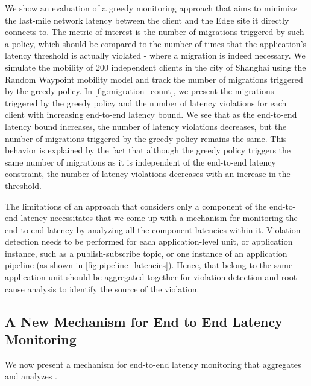 \par We show an evaluation of a greedy monitoring approach that aims to minimize the last-mile network latency between the client and the Edge site it directly connects to. The metric of interest is the number of migrations triggered by such a policy, which should be compared to the number of times that the application's latency threshold is actually violated - where a migration is indeed necessary. We simulate the mobility of 200 independent clients in the city of Shanghai using the Random Waypoint mobility model and track the number of migrations triggered by the greedy policy. In \cref{fig:migration_count}, we present the migrations triggered by the greedy policy and the number of latency violations for each client with increasing end-to-end latency bound. We see that as the end-to-end latency bound increases, the number of latency violations decreases, but the number of migrations triggered by the greedy policy remains the same. This behavior is explained by the fact that although the greedy policy triggers the same number of migrations as it is independent of the end-to-end latency constraint, the number of latency violations decreases with an increase in the threshold. 
\par The limitations of an approach that considers only a component of the end-to-end latency necessitates that we come up with a mechanism for monitoring the end-to-end latency by analyzing all the component latencies within it. Violation detection needs to be performed for each application-level unit, or application instance, such as a publish-subscribe topic, or one instance of an application pipeline (as shown in \cref{fig:pipeline_latencies}). Hence,  that belong to the same application unit should be aggregated together for violation detection and root-cause analysis to identify the source of the violation.

\subsection{A New Mechanism for End to End Latency Monitoring}
We now present a mechanism for end-to-end latency monitoring that aggregates and analyzes .
